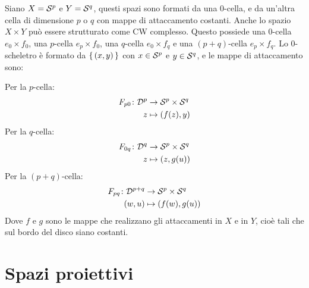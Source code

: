 \begin{example}
  Siano $ X = \mathcal{S}^{p} $ e $ Y = \mathcal{S}^{q} $, questi spazi sono formati
  da una $ 0 $-cella, e da un'altra cella di dimensione $ p $ o $ q $
  con mappe di attaccamento costanti. Anche lo spazio $ X \times Y $ può essere
  strutturato come CW complesso.
  Questo possiede una $ 0 $-cella $ e_0 \times f_0 $, una $ p $-cella
  $ e_p \times f_0 $, una $ q $-cella $ e_0 \times f_q $ e una $ (p + q) $-cella
  $ e_p \times f_q $. Lo $ 0 $-scheletro è formato da $ \set{(x,y)} $ con $ x \in \mathcal{S}^{p} $ e $ y \in \mathcal{S}^{q} $,
  e le mappe di attaccamento sono:

  \noindent
  Per la $ p $-cella:
  \begin{align*}
    F_{p0} \colon \mathcal{D}^{p} & \to \mathcal{S}^{p} \times \mathcal{S}^{q} \\
    z & \mapsto (f(z), y)
  \end{align*}
  Per la $ q $-cella:
  \begin{align*}
    F_{0q} \colon \mathcal{D}^{q} & \to \mathcal{S}^{p} \times \mathcal{S}^{q} \\
    z & \mapsto (z, g(u))
  \end{align*}
  Per la $ (p+q) $-cella:
  \begin{align*}
    F_{pq} \colon \mathcal{D}^{p+q} & \to \mathcal{S}^{p} \times \mathcal{S}^{q} \\
    (w,u) & \mapsto (f(w), g(u))
  \end{align*}
  Dove $ f $ e $ g $ sono le mappe che realizzano gli attaccamenti in $ X $ e in $ Y $,
  cioè tali che sul bordo del disco siano costanti.
\end{example}

\section{Spazi proiettivi}

